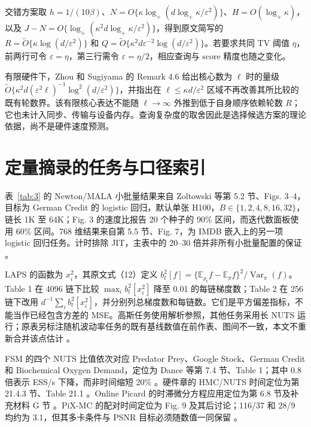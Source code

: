 \documentclass[UTF8,a4paper,zihao=-4,fontset=fandol]{ctexart}
\begin{document}
交错方案取 $h=1/(10\beta)$、$N=O\{\kappa\log_+(d\log_+\kappa/\varepsilon^2)\}$、$H=O(\log_+\kappa)$，以及 $J-N=O\{\log_+(\kappa^2d\log_+\kappa/\varepsilon^2)\}$，得到原文简写的 $R=\widetilde O\{\kappa\log(d/\varepsilon^2)\}$ 和 $Q=\widetilde O\{\kappa^2d\varepsilon^{-2}\log(d/\varepsilon^2)\}$。若要求共同 TV 阈值 $\eta$，前两行可令 $\varepsilon=\eta$，第三行需令 $\varepsilon=\eta/2$，相应查询与 score 精度也随之变化。

有限硬件下，Zhou 和 Sugiyama 的 Remark 4.6 给出核心数为 $\ell$ 时的量级 $\widetilde O\{\kappa^2d(\varepsilon^2\ell)^{-1}\log^2(d/\varepsilon^2)\}$，并指出在 $\ell\leq\kappa d/\varepsilon^2$ 区域不再改善其所比较的既有轮数界。该有限核心表达不能随 $\ell\to\infty$ 外推到低于自身顺序依赖轮数 $R$；它也未计入同步、传输与设备内存。查询复杂度的取舍因此是选择候选方案的理论依据，尚不是硬件速度预测。

\section{定量摘录的任务与口径索引}\label{app:evidence}

表~\ref{tab:3} 的 Newton/MALA 小批量结果来自 Zoltowski 等第 5.2 节、Figs. 3--4，目标为 German Credit 的 logistic 回归，默认单张 H100，$B\in\{1,2,4,8,16,32\}$，链长 1K 至 64K；Fig. 3 的速度比报告 20 个种子的 90\% 区间，而迭代数面板使用 60\% 区间。768 维结果来自第 5.5 节、Fig. 7，为 IMDB 嵌入上的另一项 logistic 回归任务。计时排除 JIT，主表中的 20--30 倍并非所有小批量配置的保证 \cite{zoltowski2025}。

LAPS 的函数为 $x_i^2$，其原文式（12）定义 $b_t^2[f]=\{\mathbb E_{\rho_t}f-\mathbb E_\pi f\}^2/\operatorname{Var}_\pi(f)$。Table 1 在 4096 链下比较 $\max_i b_t^2[x_i^2]$ 降至 0.01 的每链梯度数；Table 2 在 256 链下改用 $d^{-1}\sum_i b_t^2[x_i^2]$，并分别列总梯度数和每链数。它们是平方偏差指标，不能当作已经包含方差的 MSE。高斯任务使用解析参照，其他任务采用长 NUTS 运行；原表另标注随机波动率任务的既有基线数值在前作表、图间不一致，本文不重新合并该点估计 \cite{robnik2026}。

FSM 的四个 NUTS 比值依次对应 Predator Prey、Google Stock、German Credit 和 Biochemical Oxygen Demand，定位为 Dance 等第 7.4 节、Table 1；其中 0.8 倍表示 ESS/s 下降，而非时间缩短 20\% \cite{dance2025}。硬件章的 HMC/NUTS 时间定位为第 21.4.3 节、Table 21.1 \cite{sountsov2026}。Online Picard 的时滞微分方程应用定位为第 6.8 节及补充材料 G 节 \cite{grazzi2026}。PiX-MC 的配对时间定位为 Fig. 9 及其后讨论；116/37 和 28/9 均约为 3.1，但其多卡条件与 PSNR 目标必须随数值一同保留 \cite{wei2026}。
\end{document}
